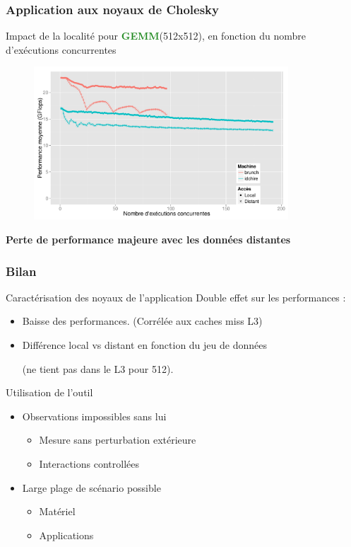 \documentclass[xcolor={usenames,dvipsnames,svgnames,table}, aspectratio=43]{beamer}
\newcommand{\gemmcolor}[1]{\textcolor{ForestGreen}{\textbf{#1}}\xspace}
\newcommand{\gemm}{\gemmcolor{GEMM}}
\begin{document}
\begin{frame}
\frametitle{Application aux noyaux de Cholesky}

Impact de la localité pour \gemm (512x512), en fonction du nombre d'exécutions concurrentes

\begin{figure}
  \centering
  \includegraphics[width=0.85\textwidth]{graph/kernel_comp_locality_gemm_512.pdf}
\end{figure}

\textbf{Perte de performance majeure avec les données distantes}

\end{frame}


\begin{frame}
  \frametitle{Bilan}
  \begin{block}{Caractérisation des noyaux de l'application}
    Double effet sur les performances :
    \begin{itemize}
      \item Baisse des performances. (Corrélée aux caches miss L3)
      \item Différence local vs distant en fonction du jeu de données

	(ne tient pas dans le L3 pour 512).
    \end{itemize}
  \end{block}

  \begin{block}{Utilisation de l'outil}
    \begin{itemize}
      \item Observations impossibles sans lui
	\begin{itemize}
	  \item Mesure sans perturbation extérieure
	  \item Interactions controllées
	\end{itemize}
      \item Large plage de scénario possible
	\begin{itemize}
	  \item Matériel
	  \item Applications
	\end{itemize}
    \end{itemize}
  \end{block}


\end{frame}
\end{document}
